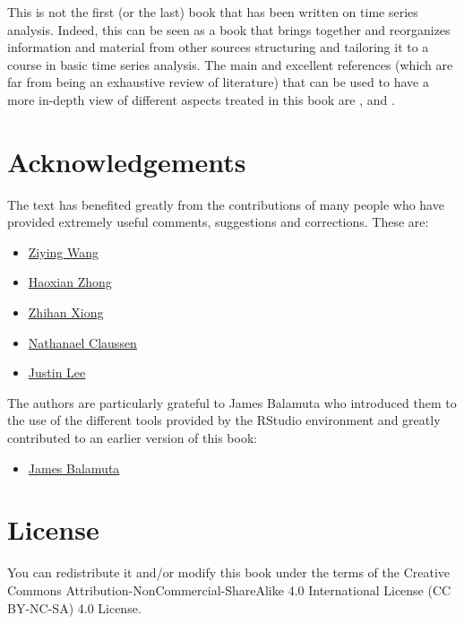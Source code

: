 \documentclass[]{book}
\providecommand{\tightlist}{%
  \setlength{\itemsep}{0pt}\setlength{\parskip}{0pt}}
\theoremstyle{definition}
\theoremstyle{definition}
\theoremstyle{definition}
\theoremstyle{remark}
\begin{document}
This is not the first (or the last) book that has been written on time
series analysis. Indeed, this can be seen as a book that brings together
and reorganizes information and material from other sources structuring
and tailoring it to a course in basic time series analysis. The main and
excellent references (which are far from being an exhaustive review of
literature) that can be used to have a more in-depth view of different
aspects treated in this book are \citet{cochrane2005time},
\citet{hamilton1994time} and \citet{shumway2010time}.

\hypertarget{acknowledgements}{%
\section{Acknowledgements}\label{acknowledgements}}

The text has benefited greatly from the contributions of many people who
have provided extremely useful comments, suggestions and corrections.
These are:

\begin{itemize}
\tightlist
\item
  \href{https://github.com/zionward}{Ziying Wang}
\item
  \href{https://github.com/Lyle-Haoxian}{Haoxian Zhong}
\item
  \href{https://www.linkedin.com/in/zhihan-xiong-988152114}{Zhihan
  Xiong}
\item
  \href{https://github.com/Nathanael-Claussen}{Nathanael Claussen}
\item
  \href{https:://github.com/munsheet}{Justin Lee}
\end{itemize}

The authors are particularly grateful to James Balamuta who introduced
them to the use of the different tools provided by the RStudio
environment and greatly contributed to an earlier version of this book:

\begin{itemize}
\tightlist
\item
  \href{https::/github.com/coatless}{James Balamuta}
\end{itemize}

\hypertarget{license}{%
\section{License}\label{license}}

You can redistribute it and/or modify this book under the terms of the
Creative Commons Attribution-NonCommercial-ShareAlike 4.0 International
License (CC BY-NC-SA) 4.0 License.
\end{document}
